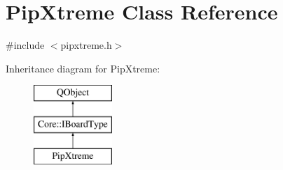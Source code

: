 \hypertarget{class_pip_xtreme}{\section{Pip\-Xtreme Class Reference}
\label{class_pip_xtreme}
}


{\ttfamily \#include $<$pipxtreme.\-h$>$}

Inheritance diagram for Pip\-Xtreme\-:\begin{figure}[H]
\begin{center}
\leavevmode
\includegraphics[height=3.000000cm]{class_pip_xtreme}
\end{center}
\end{figure}

